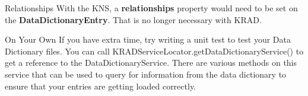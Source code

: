 \documentclass[xcolor=dvipsnames,14pt,professionalfonts]{beamer}
\begin{document}
\begin{frame}[fragile]{Relationships}
  With the KNS, a \textbf{relationships} property would need to be set
  on the \textbf{DataDictionaryEntry}. That is no longer necessary
  with KRAD.
\end{frame}


\begin{frame}{On Your Own}
If you have extra time, try writing a unit test to test your Data Dictionary files.
You can call KRADServiceLocator.getDataDictionaryService() to get a reference to the DataDictionaryService.  There are various methods on this service that can be used to query for information from the data dictionary to ensure that your entries are getting loaded correctly.
\end{frame}
\end{document}
